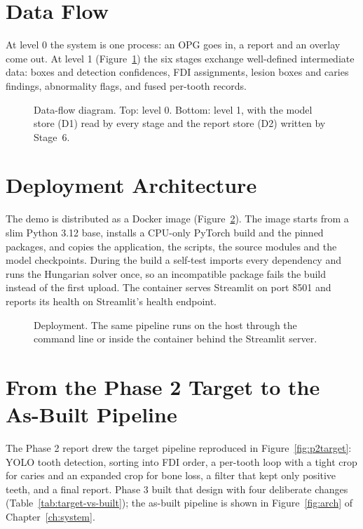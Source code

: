 \section{Data Flow}

At level 0 the system is one process: an OPG goes in, a report and an overlay come out. At level 1
(Figure~\ref{fig:dfd}) the six stages exchange well-defined intermediate data: boxes and detection
confidences, FDI assignments, lesion boxes and caries findings, abnormality flags, and fused
per-tooth records.

\begin{figure}[!htbp]
\centering

\caption[Data-flow diagram, levels 0 and 1]{Data-flow diagram. Top: level 0. Bottom: level 1, with
the model store (D1) read by every stage and the report store (D2) written by Stage~6.}
\label{fig:dfd}
\end{figure}

\section{Deployment Architecture}

The demo is distributed as a Docker image (Figure~\ref{fig:deploy}). The image starts from a slim
Python 3.12 base, installs a CPU-only PyTorch build and the pinned packages, and copies the
application, the scripts, the source modules and the model checkpoints. During the build a self-test
imports every dependency and runs the Hungarian solver once, so an incompatible package fails the
build instead of the first upload. The container serves Streamlit on port 8501 and reports its health
on Streamlit's health endpoint.

\begin{figure}[!htbp]
\centering

\caption[Deployment architecture]{Deployment. The same pipeline runs on the host through the command
line or inside the container behind the Streamlit server.}
\label{fig:deploy}
\end{figure}

\section{From the Phase 2 Target to the As-Built Pipeline}

The Phase 2 report drew the target pipeline reproduced in Figure~\ref{fig:p2target}: YOLO tooth
detection, sorting into FDI order, a per-tooth loop with a tight crop for caries and an expanded crop
for bone loss, a filter that kept only positive teeth, and a final report. Phase 3 built that design
with four deliberate changes (Table~\ref{tab:target-vs-built}); the as-built pipeline is shown in
Figure~\ref{fig:arch} of Chapter~\ref{ch:system}. %

